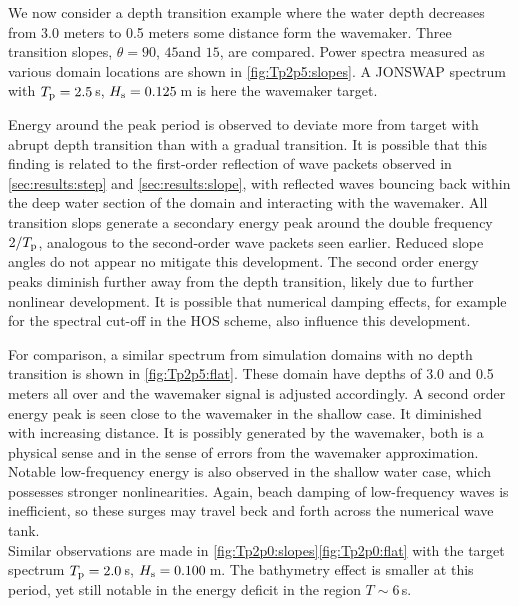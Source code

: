 \documentclass[internal]{sintefmemo}
\renewcommand{\_}[1]{_\mr{#1}}
\begin{document}
We now consider a depth transition example where the water depth decreases from 3.0 meters to 0.5 meters some distance form the wavemaker. 
Three transition slopes, $\theta = 90$\textdegree, $45$\textdegree and $15$\textdegree, are compared.
Power spectra measured as various domain locations are shown in \autoref{fig:Tp2p5:slopes}.
A JONSWAP spectrum with $T\_p=2.5$\,s, $H\_s=0.125$\,m is here the wavemaker target.

Energy around the peak period is observed to deviate more from target with abrupt depth transition than with a gradual transition. 
It is possible that this finding is related to the first-order reflection of wave packets observed in \autoref{sec:results:step}  and  \ref{sec:results:slope}, with reflected waves bouncing back within the deep water section of the domain and interacting with the wavemaker. 
All transition slops generate a secondary energy peak around the double frequency $2/T\_p$, analogous to the second-order wave packets seen earlier. 
Reduced slope angles do not appear no mitigate this development.
The second order energy peaks diminish further away from the depth transition, likely due to further nonlinear development. 
It is possible that numerical damping effects, for example for the spectral cut-off in the HOS scheme, also influence this development. 
 
For comparison, a similar spectrum from simulation domains with no depth transition is shown in \autoref{fig:Tp2p5:flat}.
These domain have depths of 3.0 and 0.5 meters all over and the wavemaker signal is adjusted accordingly. 
A second order energy peak is seen close to the wavemaker in the shallow case. It diminished with increasing distance. 
It is possibly generated by the wavemaker, both is a physical sense and in the sense of errors from the wavemaker approximation.
Notable low-frequency energy is also observed in the shallow water case, which possesses stronger nonlinearities. 
Again, beach damping of low-frequency waves is inefficient, so these surges may travel beck and forth across the numerical wave tank. 
\\

Similar observations are made in  \autoref{fig:Tp2p0:slopes}\ref{fig:Tp2p0:flat} with the target spectrum $T\_p=2.0$\,s, $H\_s=0.100$\,m.
The bathymetry effect is smaller at this period, yet still notable in the energy deficit in the region $T\sim 6$\,s.
\end{document}
